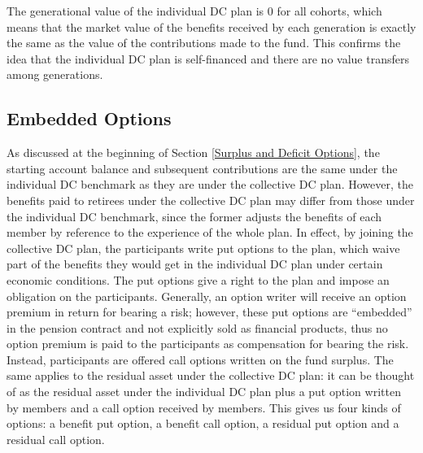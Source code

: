 \documentclass{sfuthesis}
\numberwithin{equation}{chapter}
\begin{document}
	
		\justify
		The generational value of the individual DC plan is $0$ for all cohorts, which means that the market value of the benefits received by each generation is exactly the same as the value of the contributions made to the fund. This confirms the idea that the individual DC plan is self-financed and there are no value transfers among generations.
	
	
	\subsection{Embedded Options}
	\label{Embedded Options}
	
		\justify
		As discussed at the beginning of Section \ref{Surplus and Deficit Options}, the starting account balance and subsequent contributions are the same under the individual DC benchmark as they are under the collective DC plan. However, the benefits paid to retirees under the collective DC plan may differ from those under the individual DC benchmark, since the former adjusts the benefits of each member by reference to the experience of the whole plan. In effect, by joining the collective DC plan, the participants write put options to the plan, which waive part of the benefits they would get in the individual DC plan under certain economic conditions. The put options give a right to the plan and impose an obligation on the participants. Generally, an option writer will receive an option premium in return for bearing a risk; however, these put options are ``embedded'' in the pension contract and not explicitly sold as financial products, thus no option premium is paid to the participants as compensation for bearing the risk. Instead, participants are offered call options written on the fund surplus. The same applies to the residual asset under the collective DC plan: it can be thought of as the residual asset under the individual DC plan plus a put option written by members and a call option received by members. This gives us four kinds of options: a benefit put option, a benefit call option, a residual put option and a residual call option. 
		
\end{document}
